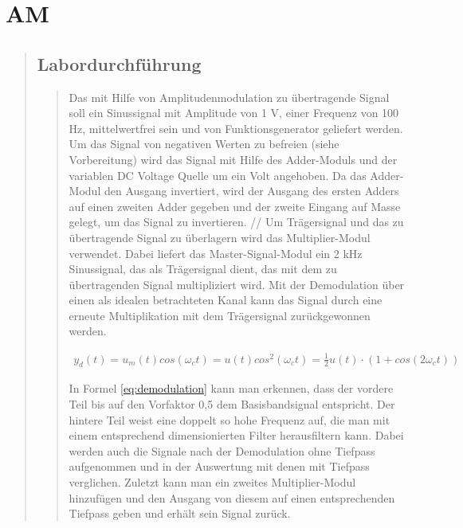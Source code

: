 

\section{AM}
\begin{quote}
    
    
    \subsection{Labordurchführung}
    \begin{quote}
      Das mit Hilfe von Amplitudenmodulation zu übertragende Signal soll ein
      Sinussignal mit Amplitude von 1 V, einer Frequenz von 100 Hz, mittelwertfrei sein und von Funktionsgenerator geliefert 
      werden. Um das Signal von negativen Werten zu befreien (siehe
      Vorbereitung) wird das Signal mit Hilfe des Adder-Moduls und der variablen DC Voltage Quelle
      um ein Volt angehoben. Da das Adder-Modul den Ausgang invertiert, wird der
      Ausgang des ersten Adders auf einen zweiten Adder gegeben und der zweite
      Eingang auf Masse gelegt, um das Signal zu invertieren. //
      Um Trägersignal und das zu übertragende Signal zu überlagern wird das
      Multiplier-Modul verwendet. Dabei liefert das Master-Signal-Modul ein 2
      kHz Sinussignal, das als Trägersignal dient, das mit dem zu übertragenden
      Signal multipliziert wird.
        Mit der Demodulation über einen als idealen betrachteten Kanal kann das
        Signal durch eine erneute Multiplikation mit dem Trägersignal
        zurückgewonnen werden.
        
      \begin{equation*}
        \begin{split}
         y_{d}(t)=u_{m}(t)cos(\omega_{c}t)=u(t)cos^{2}(\omega_{c}t)=\frac{1}{2}u(t)\cdot
         (1+cos(2\omega_{c}t))
         \label{eq:demodulation}
        \end{split}
        \end{equation*}
        
        In Formel \ref{eq:demodulation} kann man erkennen, dass der vordere Teil
        bis auf den Vorfaktor 0,5 dem Basisbandsignal entspricht. Der hintere
        Teil weist eine doppelt so hohe Frequenz auf, die man mit einem
        entsprechend dimensionierten Filter herausfiltern kann.
        Dabei werden auch die Signale nach der Demodulation ohne Tiefpass
        aufgenommen und in der Auswertung mit denen mit Tiefpass verglichen.
        Zuletzt kann man ein zweites Multiplier-Modul hinzufügen und den Ausgang
        von diesem auf einen entsprechenden Tiefpass geben und erhält sein
        Signal zurück.
        

\end{quote}
\end{quote}

